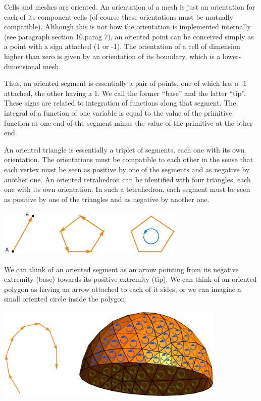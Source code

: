 Cells and meshes are oriented. 
An orientation of a mesh is just an orientation for each of its component cells
(of course these orientations must be mutually compatible).
Although this is not how the orientation is implemented internally
(see paragraph \numb section 10.\numb parag 7),
an oriented point can be conceived simply as a point with a sign attached (1 or -1). 
The orientation of a cell of dimension higher than zero is given by an orientation
of its boundary, which is a lower-dimensional mesh.

Thus, an oriented segment is essentially a pair of points, one of which has a \hbox{-1}
attached, the other having a 1.
We call the former ``base'' and the latter ``tip''.
These signs are related to integration of functions along that segment.
The integral of a function of one variable is equal to the value of the 
primitive function at one end of the segment minus the value of the primitive at the other end.

An oriented triangle is essentially a triplet of segments, each one with its own orientation.
The orientations must be compatible to each other in the sense that each vertex 
must be seen as positive by one of the segments and as negative by another one.
An oriented tetrahedron can be identified with four triangles, each one with its own
orientation.
In such a tetrahedron, each segment must be seen as positive by one of the triangles and
as negative by another one.

\medskip
{ 
\centerline{\includegraphics[width=90mm]{oriented-cells.eps}} }

We can think of an oriented segment as an arrow pointing from its negative extremity (base)
towards its positive extremity (tip).
We can think of an oriented polygon as having an arrow attached to each of it sides,
or we can imagine a small oriented circle inside the polygon.

\medskip
\centerline{\includegraphics[width=110mm]{hemisphere-7.eps}}

